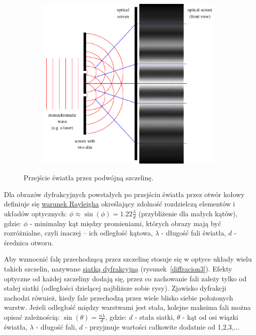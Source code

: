 \begin{figure} [H]
	\centering
	\begin{subfigure}{.99\textwidth}
		\centering
		\includegraphics[width=0.6\linewidth]{generalIssues/Figures/diffraction2.png}
	\end{subfigure}
	\caption{Przejście światła przez podwójną szczelinę.}
	\label{diffracion2}
\end{figure}

Dla obrazów dyfrakcyjnych powstałych po przejściu światła przez otwór kołowy definiuje się \underline{warunek Rayleigha} określający zdolność rozdzielczą elementów i układów optycznych:\newline
$ \phi \approx \sin(\phi) = 1.22 \frac{\lambda}{d} $ (przybliżenie dla małych kątów), gdzie:\newline
$ \phi $ - minimalny kąt między promieniami, których obrazy mają być rozróżnialne, czyli inaczej – ich odległość kątowa,\newline
$ \lambda $ - długość fali światła,\newline
$ d $ - średnica otworu.\newline

Aby wzmocnić falę przechodzącą przez szczelinę stosuje się w optyce układy wielu takich szczelin, nazywane \underline{siatką dyfrakcyjną} (rysunek~\ref{diffracion3}). Efekty optyczne od każdej szczeliny dodają się, przez co zachowanie fali zależy tylko od stałej siatki (odległości dzielącej najbliższe sobie rysy). Zjawisko dyfrakcji zachodzi również, kiedy fale przechodzą przez wiele blisko siebie położonych warstw. Jeżeli odległość między warstwami jest stała, kolejne maksima fali można opisać zależnością:\newline
$ \sin(\theta) = \frac{n\lambda}{d} $, gdzie:\newline
$ d $ - stała siatki,\newline
$ \theta $ - kąt od osi wiązki światła,\newline
$ \lambda $ - długość fali,\newline
$ d $ - przyjmuje wartości całkowite dodatnie od 1,2,3,...\newline

